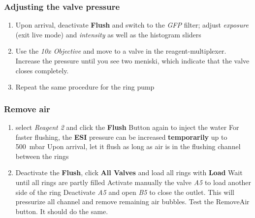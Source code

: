 \documentclass{article}
\newcounter{ListCounter}
\begin{document}
	\subsubsection{Adjusting the valve pressure}
	\begin{enumerate}                 
	\setcounter{enumi}{\value{ListCounter}}
	\item Upon arrival, deactivate \textbf{Flush} and switch to the \textit{GFP} filter; adjust \textit{exposure} (exit live mode) and \textit{intensity} as well as the histogram sliders
	\item Use the \textit{10x Objective} and move to a valve in the reagent-multiplexer.
	\subitem Increase the pressure until you see two meniski, which indicate that the valve closes completely.
	\item Repeat the same procedure for the ring pump	\setcounter{ListCounter}{\value{enumi}}
\end{enumerate}


	
	\subsubsection{Remove air}
			\begin{enumerate}
		\setcounter{enumi}{\value{ListCounter}}
	\item select \textit{Reagent 2} and click the \textbf{Flush} Button again to inject the water
	\subitem For faster flushing, the \textbf{ESI} pressure can be increased \textbf{temporarily} up to \SI{500}{\milli \bar}  
	\subitem Upon arrival, let it flush as long as air is in the flushing channel between the rings
	\item Deactivate the \textbf{Flush}, click \textbf{All Valves} and load all rings with \textbf{Load}
	\subitem Wait until all rings are partly filled
	\subitem Activate manually the valve \textit{A5} to load another side of the ring
	\subitem Deactivate \textit{A5} and open \textit{B5} to close the outlet.
	\subitem This will pressurize all channel and remove remaining air bubbles.
	\subitem Test the RemoveAir button. It should do the same.
		\setcounter{ListCounter}{\value{enumi}}
\end{enumerate}


	
\end{document}

